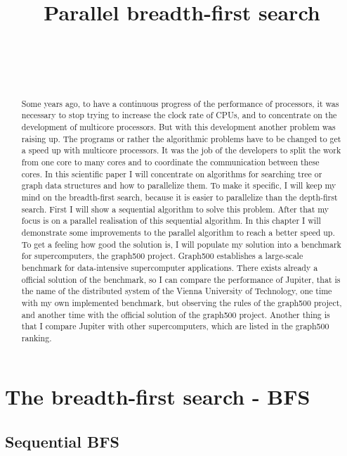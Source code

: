 \documentclass[12pt,a4paper]{article}
\title{Parallel breadth-first search}
\author{
 \authorname{Alexander Gallauner} \\
 \studentnumber{1026090} \\
 \curriculum{534} \\
 \email{alexander.gallauner@gmail.com}
}
\begin{document}
\maketitle
\begin{abstract}
Some years ago, to have a continuous progress of the performance of processors, it was necessary to stop trying to increase the clock rate of CPUs, and to concentrate on the development of multicore processors. But with this development another problem was raising up. The programs or rather the algorithmic problems have to be changed to get a speed up with multicore processors. It was the job of the developers to split the work from one core to many cores and to coordinate the communication between these cores. In this scientific paper I will concentrate on algorithms for searching tree or graph data structures and how to parallelize them. To make it specific, I will keep my mind on the breadth-first search, because it is easier to parallelize than the depth-first search. First I will show a sequential algorithm to solve this problem. After that my focus is on a parallel realisation of this sequential algorithm. In this chapter I will demonstrate some improvements to the parallel algorithm to reach a better speed up.
To get a feeling how good the solution is, I will populate my solution into a benchmark for supercomputers, the graph500 project. Graph500 establishes a large-scale benchmark for data-intensive supercomputer applications. There exists already a official solution of the benchmark, so I can compare the performance of Jupiter, that is the name of the distributed system of the Vienna University of Technology, one time with my own implemented benchmark, but observing the rules of the graph500 project, and another time with the official solution of the graph500 project. Another thing is that I compare Jupiter with other supercomputers, which are listed in the graph500 ranking.
\end{abstract}

\clearpage

\section{The breadth-first search - BFS}
\label{sec:breadth-first search}

\subsection{Sequential BFS}
\label{sec:sequential-bfs}
\end{document}
